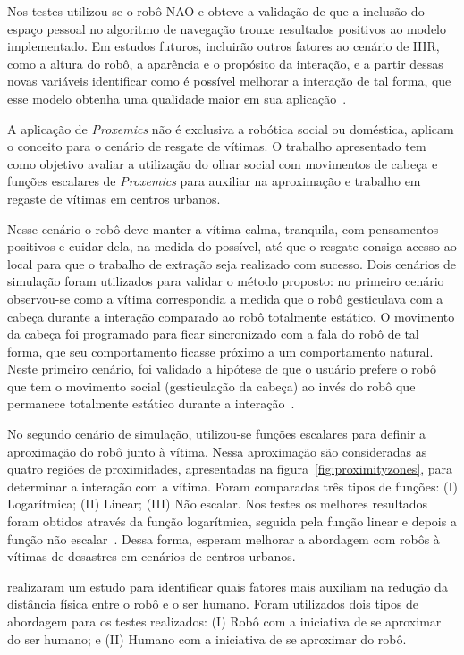 Nos testes utilizou-se o robô NAO e obteve a validação de que a inclusão do espaço pessoal no algoritmo de navegação trouxe resultados positivos ao modelo implementado. Em estudos futuros,  incluirão outros fatores ao cenário de IHR, como a altura do robô, a aparência e o propósito da interação, e a partir dessas novas variáveis identificar como é possível melhorar a interação de tal forma, que esse modelo obtenha uma qualidade maior em sua aplicação~\cite{torta:2011}.

A aplicação de \emph{Proxemics} não é exclusiva a robótica social ou doméstica,  aplicam o conceito para o cenário de resgate de vítimas. O trabalho apresentado tem como objetivo avaliar a utilização do olhar social com movimentos de cabeça e funções escalares de \emph{Proxemics} para auxiliar na aproximação e trabalho em regaste de vítimas em centros urbanos.

Nesse cenário o robô deve manter a vítima calma, tranquila, com pensamentos positivos e cuidar dela, na medida do possível, até que o resgate consiga acesso ao local para que o trabalho de extração seja realizado com sucesso. Dois cenários de simulação foram utilizados para validar o método proposto: no primeiro cenário observou-se como a vítima correspondia a medida que o robô gesticulava com a cabeça durante a interação comparado ao robô totalmente estático. O movimento da cabeça foi programado para ficar sincronizado com a fala do robô de tal forma, que seu comportamento ficasse próximo a um comportamento natural. Neste primeiro cenário, foi validado a hipótese de que o usuário prefere o robô que tem o movimento social (gesticulação da cabeça) ao invés do robô que permanece totalmente estático durante a interação~\cite{srinivasan:2012}.

No segundo cenário de simulação, utilizou-se funções escalares para definir a aproximação do robô junto à vítima. Nessa aproximação são consideradas as quatro regiões de proximidades, apresentadas na figura~\ref{fig:proximityzones}, para determinar a interação com a vítima. Foram comparadas três tipos de funções: (I) Logarítmica; (II) Linear; (III) Não escalar. Nos testes os melhores resultados foram obtidos através da função logarítmica, seguida pela função linear e depois a função não escalar~\cite{srinivasan:2012}. Dessa forma,  esperam melhorar a abordagem com robôs à vítimas de desastres em cenários de centros urbanos.

 realizaram um estudo para identificar quais fatores mais auxiliam na redução da distância física entre o robô e o ser humano. Foram utilizados dois tipos de abordagem para os testes realizados: (I) Robô com a iniciativa de se aproximar do ser humano; e (II) Humano com a iniciativa de se aproximar do robô.

